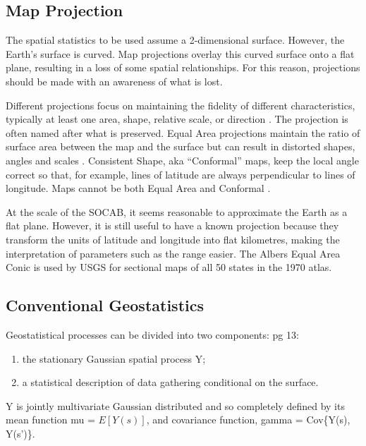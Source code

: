 \documentclass{article}
\begin{document}
	\subsection{Map Projection} \label{subsec:MapProjection}
	The spatial statistics to be used assume a 2-dimensional surface. However, the Earth's surface is curved.  Map projections overlay this curved surface onto a flat plane, resulting in a loss of some spatial relationships.  For this reason, projections should be made with an awareness of what is lost.  
	
	Different projections focus on maintaining the fidelity of different characteristics, typically at least one area, shape, relative scale, or direction \citep{USGS:MapProjections}.  The projection is often named after what is preserved.  Equal Area projections maintain the ratio of surface area between the map and the surface but can result in distorted shapes, angles and scales \citep{USGS:MapProjections}.  Consistent Shape,  aka ``Conformal'' maps, keep the local angle correct so that, for example, lines of latitude are always perpendicular to lines of longitude.  Maps cannot be both Equal Area and Conformal  \citep{USGS:MapProjections}.
	
	At the scale of the \ac{SOCAB}, it seems reasonable to approximate the Earth as a flat plane.  However, it is still useful to have a known projection because they transform the units of latitude and longitude into flat kilometres, making the interpretation of parameters such as the range easier.  The Albers Equal Area Conic is used by \ac{USGS} for sectional maps of all 50 states in the 1970 atlas.
	
	
	
	
	
	
	
	\subsection{Conventional Geostatistics}
	\label{subsec:convgeostats}
	
	Geostatistical processes can be divided into two components: 
	\citep{diggle:07} pg 13: 
	\begin{enumerate}
		\item the stationary Gaussian spatial process \gls{Y};
		\item a statistical description of data gathering conditional on the surface.
	\end{enumerate}
	
	\gls{Y} is jointly multivariate Gaussian distributed and so completely defined by its mean function \gls{mu} = $E[Y(s)]$, and covariance function, \gls{gamma} = 
	Cov\{Y(s), Y(s')\}.
	
\end{document}
